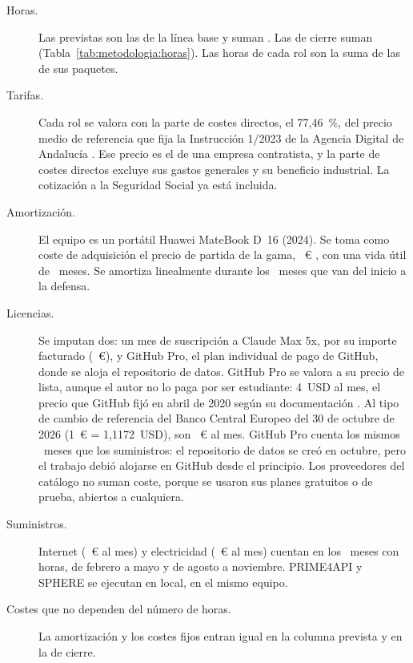 \begin{description}
  \item[Horas.] Las previstas son las de la línea base y suman
    . Las de cierre suman 
    (Tabla~\ref{tab:metodologia:horas}). Las horas de cada rol son la suma
    de las de sus paquetes.
  \item[Tarifas.] Cada rol se valora con la parte de costes directos,
    el 77,46~\%, del precio medio de referencia que fija la Instrucción
    1/2023 de la Agencia Digital de Andalucía \citep{ada2023perfiles}.
    Ese precio es el de una empresa contratista, y la parte de costes
    directos excluye sus gastos generales y su beneficio industrial. La
    cotización a la Seguridad Social ya está incluida.
  \item[Amortización.] El equipo es un portátil Huawei MateBook D~16
    (2024). Se toma como coste de adquisición el precio de partida de la
    gama, ~€ \citep{xataka2024matebook}, con una vida
    útil de ~meses. Se amortiza linealmente durante los
    ~meses que van del inicio a la defensa.
  \item[Licencias.] Se imputan dos: un mes de suscripción a Claude
    Max 5x, por su importe facturado (~€), y
    GitHub Pro, el plan individual de pago de GitHub, donde se aloja el
    repositorio de datos. GitHub Pro se valora a su precio de lista,
    aunque el autor no lo paga por ser estudiante: 4~USD al mes, el precio
    que GitHub fijó en abril de 2020 según su documentación
    \citep{githubfaqplanes}. Al tipo de cambio de referencia del Banco
    Central Europeo \citep{bce2026usd} del 30 de octubre de 2026
    (1~€ = 1,1172~USD), son ~€ al mes. GitHub
    Pro cuenta los mismos ~meses que los
    suministros: el repositorio de datos se creó en octubre, pero el
    trabajo debió alojarse en GitHub desde el principio. Los proveedores del
    catálogo no suman coste, porque se usaron sus planes gratuitos o de
    prueba, abiertos a cualquiera.
  \item[Suministros.] Internet (~€ al mes)
    y electricidad (~€ al mes) cuentan en los
    ~meses con horas,
    de febrero a mayo y de agosto a noviembre. PRIME4API y SPHERE se
    ejecutan en local, en el mismo equipo.
  \item[Costes que no dependen del número de horas.] La amortización y los
    costes fijos entran igual en la columna prevista y en la de cierre.
\end{description}

